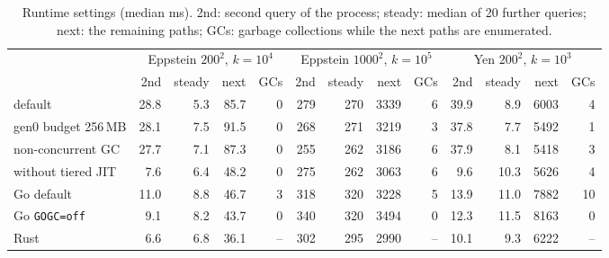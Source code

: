 \begin{table}[t]
\centering
\caption{Runtime settings (median ms). 2nd: second query of the process; steady: median of 20 further queries; next: the remaining paths; GCs: garbage collections while the next paths are enumerated.}
\label{tab:runtime}
\footnotesize\setlength{\tabcolsep}{3.5pt}
\begin{tabular}{@{}lrrrrrrrrrrrr@{}}
\toprule
 & \multicolumn{4}{c}{Eppstein $200^2$, $k=10^4$} & \multicolumn{4}{c}{Eppstein $1000^2$, $k=10^5$} & \multicolumn{4}{c}{Yen $200^2$, $k=10^3$} \\ \cmidrule(lr){2-5}\cmidrule(lr){6-9}\cmidrule(lr){10-13}
 & 2nd & steady & next & GCs & 2nd & steady & next & GCs & 2nd & steady & next & GCs \\
\midrule
\cs{} default & 28.8 & 5.3 & 85.7 & 0 & \num{279} & \num{270} & \num{3339} & 6 & 39.9 & 8.9 & \num{6003} & 4 \\
\cs{} gen0 budget 256\,MB & 28.1 & 7.5 & 91.5 & 0 & \num{268} & \num{271} & \num{3219} & 3 & 37.8 & 7.7 & \num{5492} & 1 \\
\cs{} non-concurrent GC & 27.7 & 7.1 & 87.3 & 0 & \num{255} & \num{262} & \num{3186} & 6 & 37.9 & 8.1 & \num{5418} & 3 \\
\cs{} without tiered JIT & 7.6 & 6.4 & 48.2 & 0 & \num{275} & \num{262} & \num{3063} & 6 & 9.6 & 10.3 & \num{5626} & 4 \\
Go default & 11.0 & 8.8 & 46.7 & 3 & \num{318} & \num{320} & \num{3228} & 5 & 13.9 & 11.0 & \num{7882} & 10 \\
Go \texttt{GOGC=off} & 9.1 & 8.2 & 43.7 & 0 & \num{340} & \num{320} & \num{3494} & 0 & 12.3 & 11.5 & \num{8163} & 0 \\
Rust & 6.6 & 6.8 & 36.1 & -- & \num{302} & \num{295} & \num{2990} & -- & 10.1 & 9.3 & \num{6222} & -- \\
\bottomrule
\end{tabular}
\end{table}
